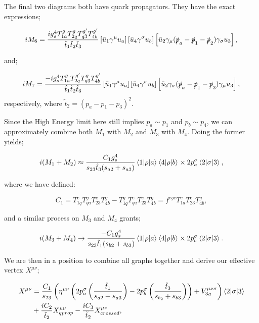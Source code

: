 The final two diagrams both have quark propagators. They have the exact expressions;

\begin{equation}
iM_6 = \frac{i g_s^4 T^g_{1a} T^{g}_{2q} T^{g'}_{q3}  T^{g'}_{4b}}{\hat{t}_1 \hat{t}_2 \hat{t}_3}\left[\bar{u}_1 \gamma^\mu u_a \right] \left[\bar{u}_4 \gamma^\sigma u_b \right] \left[\bar{u}_2 \gamma_\mu(\slashed{p}_a - \slashed{p}_1 -\slashed{p}_2) \gamma_\sigma u_3 \right],
\end{equation}

and;

\begin{equation}
iM_7 = \frac{-i g_s^4 T^g_{1a} T^{g'}_{2q} T^{g}_{q3}  T^{g'}_{4b}}{\hat{t}_1 \tilde{t}_2 \hat{t}_3}\left[\bar{u}_1 \gamma^\mu u_a \right] \left[\bar{u}_4 \gamma^\sigma u_b \right] \left[\bar{u}_2 \gamma_\sigma(\slashed{p}_a - \slashed{p}_1 -\slashed{p}_3) \gamma_\mu u_3 \right],
\end{equation}
respectively, where $\tilde{t}_2 = (p_a-p_1-p_3)^2$. 

Since the High Energy limit here still implies $p_a \sim p_1$ and $p_b \sim p_4$, we can approximately combine both $M_1$ with $M_2$ and $M_3$ with $M_4$. Doing the former yields;

\begin{equation}
i(M_1 + M_2) \approx \frac{ C_1 g_s^4}{s_{23} \hat{t}_3 (s_{a2} + s_{a3})} \mathinner{\langle1\vert\rho\vert a\rangle}_{} \mathinner{\langle4\vert\rho\vert b\rangle}_{} \times 2 p_a^\sigma \mathinner{\langle2\vert\sigma\vert3\rangle}_{},
\end{equation} 

where we have defined:

\begin{equation}
C_1 = T^e_{1q}T^g_{qa} T^e_{23}T^g_{4b} - T^g_{1q}T^e_{qa}T^e_{23}T^g_{4b} = f^{egc}T^c_{1a}T^e_{23}T^g_{4b},
\end{equation}

and a similar process on $M_3$ and $M_4$ grants;

\begin{equation}
i(M_3 + M_4) \to \frac{-C_1 g_s^4}{s_{23}\hat{t}_1 (s_{b2}+s_{b3})} \mathinner{\langle1\vert\rho\vert a\rangle}_{} \mathinner{\langle4\vert\rho\vert b\rangle}_{} \times 2 p_b^\sigma \mathinner{\langle2\vert\sigma\vert3\rangle}_{}. 
\end{equation}

We are then in a position to combine all graphs together and derive our effective vertex $X^{\mu \nu}$;

\begin{equation}
\begin{split}
X^{\mu \nu} &=  \frac{C_1}{s_{23}}\left(\eta^{\mu \nu}\left(2 p_a^\sigma \left( \frac{\hat{t}_1}{s_{a2}+s_{a3}} \right) - 2 p_b^\sigma \left(\frac{\hat{t}_3}{s_{b_2}+s_{b3}} \right) \right)+ V_{3g}^{\mu \nu \sigma} \right)\mathinner{\langle2\vert\sigma\vert3\rangle}_{} \\
&+ \frac{i C_2}{\hat{t}_2} X_{qprop}^{\mu \nu} - \frac{i C_3}{\tilde{t}_2} X_{crossed}^{\mu \nu},
\end{split}
\end{equation}

